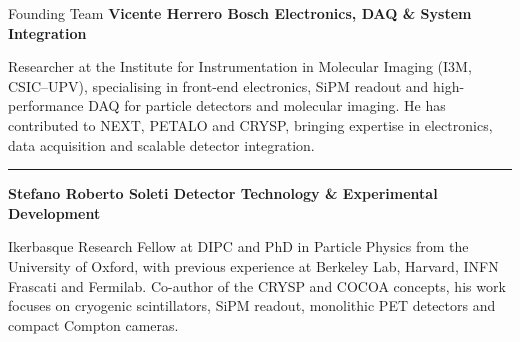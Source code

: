 \documentclass[aspectratio=169,11pt]{beamer}
\begin{document}
\begin{frame}{Founding Team}
{\scriptsize\bfseries\color{PTblue}
Vicente Herrero Bosch
\hfill
{\tiny\bfseries\color{black}
Electronics, DAQ \& System Integration}
}



{\tiny
Researcher at the Institute for Instrumentation in Molecular Imaging
(I3M, CSIC--UPV), specialising in front-end electronics, SiPM readout
and high-performance DAQ for particle detectors and molecular imaging.
He has contributed to NEXT, PETALO and CRYSP, bringing expertise in
electronics, data acquisition and scalable detector integration.
}


{\color{gray!35}\rule{\textwidth}{0.35pt}}



{\scriptsize\bfseries\color{PTblue}
Stefano Roberto Soleti
\hfill
{\tiny\bfseries\color{black}
Detector Technology \& Experimental Development}
}



{\tiny
Ikerbasque Research Fellow at DIPC and PhD in Particle Physics from
the University of Oxford, with previous experience at Berkeley Lab,
Harvard, INFN Frascati and Fermilab. Co-author of the CRYSP and COCOA
concepts, his work focuses on cryogenic scintillators, SiPM readout,
monolithic PET detectors and compact Compton cameras.
}

\vfill

\end{frame}


\end{document}
